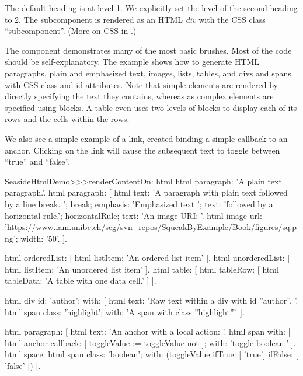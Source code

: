 \documentclass[a4paper,10pt,twoside]{book}
\begin{document}

The default heading is at level 1.
We explicitly set the level of the second heading to 2.
The subcomponent is rendered as an HTML \emph{div} with the CSS class ``subcomponent''.
(More on CSS in .)

The  component demonstrates many of the most basic brushes.
Most of the code should be self-explanatory.
The example shows how to generate HTML paragraphs, plain and emphasized text, images, lists, tables, and divs and spans with CSS class and id attributes.
Note that simple elements are rendered by directly specifying the text they contains, whereas as complex elements are specified using blocks.
A table even uses two levels of blocks to display each of its rows and the cells within the rows.

We also see a simple example of a link, created binding a simple callback to an anchor.
Clicking on the link will cause the subsequent text to toggle between ``true'' and ``false''.

\begin{code}{}
SeasideHtmlDemo>>>renderContentOn: html
	html paragraph: 'A plain text paragraph.'.
	html paragraph: [
		html
			text: 'A paragraph with plain text followed by a line break. ';
			break;
			emphasis: 'Emphasized text ';
			text: 'followed by a horizontal rule.';
			horizontalRule;
			text: 'An image URI: '.
			html image
				url: 'https://www.iam.unibe.ch/scg/svn_repos/SqueakByExample/Book/figures/sq.png';
				width: '50'.
		].

	html orderedList: [ html listItem: 'An ordered list item' ].
	html unorderedList: [ html listItem: 'An unordered list item' ].
	html table: [ html tableRow: [ html tableData: 'A table with one data cell.' ] ].

	html div id: 'author';
		with: [
			html text: 'Raw text within a div with id ''author''. '.
			html span class: 'highlight'; with: 'A span with class ''highlight''.'. ].

	html paragraph: [
		html text: 'An anchor with a local action: '.
		html span
			with: [
				html anchor
					callback: [ toggleValue := toggleValue not ];
					with: 'toggle boolean:'
			].
		html space.
		html span
			class: 'boolean';
			with: (toggleValue ifTrue: [ 'true'] ifFalse: [ 'false' ])
		].
\end{code}{}
\end{document}
